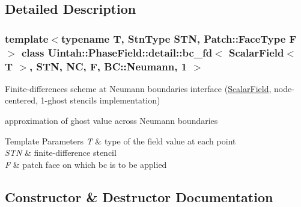 \subsection{Detailed Description}
\subsubsection*{template$<$typename T, Stn\+Type S\+TN, Patch\+::\+Face\+Type F$>$\newline
class Uintah\+::\+Phase\+Field\+::detail\+::bc\+\_\+fd$<$ Scalar\+Field$<$ T $>$, S\+T\+N, N\+C, F, B\+C\+::\+Neumann, 1 $>$}

Finite-\/differences scheme at Neumann boundaries interface (\hyperlink{structUintah_1_1PhaseField_1_1ScalarField}{Scalar\+Field}, node-\/centered, 1-\/ghost stencils implementation) 

approximation of ghost value across Neumann boundaries


\begin{DoxyTemplParams}{Template Parameters}
{\em T} & type of the field value at each point \\
\hline
{\em S\+TN} & finite-\/difference stencil \\
\hline
{\em F} & patch face on which bc is to be applied \\
\hline
\end{DoxyTemplParams}


\subsection{Constructor \& Destructor Documentation}
\mbox{\label{classUintah_1_1PhaseField_1_1detail_1_1bc__fd_3_01ScalarField_3_01T_01_4_00_01STN_00_01NC_00_01F_00_01BC_1_1Neumann_00_011_01_4_a8ffff403ebc837ea64fe01e7fcf1ef06}} 

